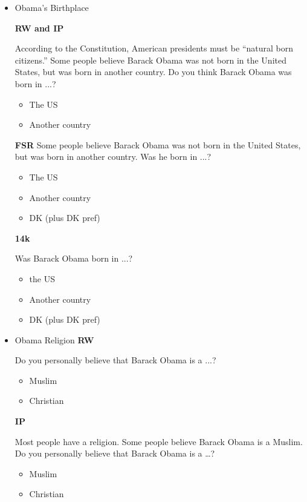 \documentclass[12pt, letterpaper]{article}
\begin{document}
\begin{itemize}
\item Obama's Birthplace

\textbf{RW and IP}\newline

According to the Constitution, American presidents must be ``natural born citizens.''
Some people believe Barack Obama was not born in the United States, but was born
in another country. Do you think Barack Obama was born in ...?
\begin{itemize}
	\item The US
	\item Another country
\end{itemize}

\textbf{FSR}\newline
Some people believe Barack Obama was not born in the United States, but was born
in another country. Was he born in ...?
\begin{itemize}
	\item The US
	\item Another country
	\item DK (plus DK pref)
\end{itemize}

\textbf{14k}\newline

Was Barack Obama born in ...?
\begin{itemize}
	\item the US
	\item Another country
	\item DK (plus DK pref)
\end{itemize}

\item Obama Religion\newline
\textbf{RW}\newline

Do you personally believe that Barack Obama is a ...?
\begin{itemize}
	\item Muslim
	\item Christian
\end{itemize}

\textbf{IP}\newline

Most people have a religion. Some people believe Barack Obama is a Muslim. Do
you personally believe that Barack Obama is a \ldots?
\begin{itemize}
	\item Muslim
	\item Christian
\end{itemize}


\end{itemize}
\end{document}
